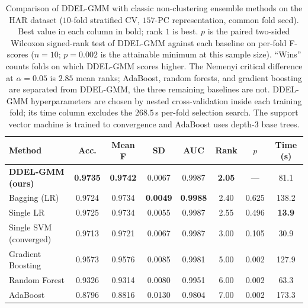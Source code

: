 \documentclass[lettersize,journal]{IEEEtran}
\begin{document}
{{{		\begin{table}[htbp]
			\begin{center}
				\caption{Comparison of DDEL-GMM with classic non-clustering ensemble methods on the HAR dataset ($10$-fold stratified CV, $157$-PC representation, common fold seed). Best value in each column in bold; rank $1$ is best. $p$ is the paired two-sided Wilcoxon signed-rank test of DDEL-GMM against each baseline on per-fold F-scores ($n=10$; $p=0.002$ is the attainable minimum at this sample size). ``Wins'' counts folds on which DDEL-GMM scores higher. The Nemenyi critical difference at $\alpha=0.05$ is $2.85$ mean ranks; AdaBoost, random forests, and gradient boosting are separated from DDEL-GMM, the three remaining baselines are not. DDEL-GMM hyperparameters are chosen by nested cross-validation inside each training fold; its time column excludes the $268.5$\,s per-fold selection search. The support vector machine is trained to convergence and AdaBoost uses depth-$3$ base trees.}
				\label{tab:noclustering}
				\setlength{\tabcolsep}{2.5pt}
				\begin{tabular}{|l|c|c|c|c|c|c|c|}
					\hline
					\textbf{Method} & \textbf{Acc.} & \textbf{Mean F} & \textbf{SD} & \textbf{AUC} & \textbf{Rank} & \textbf{$p$} & \textbf{Time (s)} \\
					\hline
					\textbf{DDEL-GMM (ours)} & \textbf{0.9735} & \textbf{0.9742} & 0.0067 & 0.9987 & \textbf{2.05} & --- & 81.1 \\
					\hline
					Bagging (LR) \cite{breiman_bagging_1996} & 0.9724 & 0.9734 & \textbf{0.0049} & \textbf{0.9988} & 2.40 & 0.625 & 138.2 \\
					\hline
					Single LR & 0.9725 & 0.9734 & 0.0055 & 0.9987 & 2.55 & 0.496 & \textbf{13.9} \\
					\hline
					Single SVM (converged) & 0.9713 & 0.9721 & 0.0067 & 0.9987 & 3.00 & 0.105 & 30.9 \\
					\hline
					Gradient Boosting \cite{friedman_greedy_2001} & 0.9573 & 0.9576 & 0.0085 & 0.9981 & 5.00 & 0.002 & 127.9 \\
					\hline
					Random Forest \cite{breiman_random_2001} & 0.9326 & 0.9314 & 0.0080 & 0.9951 & 6.00 & 0.002 & 63.3 \\
					\hline
					AdaBoost \cite{freund_decision-theoretic_1997} & 0.8796 & 0.8816 & 0.0130 & 0.9804 & 7.00 & 0.002 & 173.3 \\
					\hline
				\end{tabular}
			\end{center}
		\end{table}
		
}}}
\end{document}
